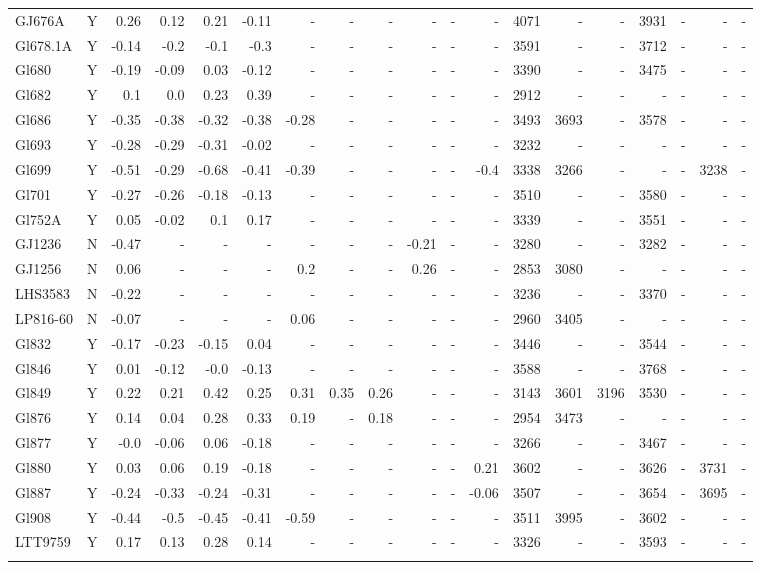 \documentclass{aa}
\begin{document}
{\begin{landscape}
{\begin{longtable}{l c r r r r r r r r r r | r r r r r r r }
GJ676A & Y & 0.26 & 0.12 & 0.21 & -0.11 & - & - & - & - & - & - & 4071 & - & - & 3931 & - & - & - \\
Gl678.1A & Y & -0.14 & -0.2 & -0.1 & -0.3 & - & - & - & - & - & - & 3591 & - & - & 3712 & - & - & - \\
Gl680 & Y & -0.19 & -0.09 & 0.03 & -0.12 & - & - & - & - & - & - & 3390 & - & - & 3475 & - & - & - \\
Gl682 & Y & 0.1 & 0.0 & 0.23 & 0.39 & - & - & - & - & - & - & 2912 & - & - & - & - & - & - \\
Gl686 & Y & -0.35 & -0.38 & -0.32 & -0.38 & -0.28 & - & - & - & - & - & 3493 & 3693 & - & 3578 & - & - & - \\
Gl693 & Y & -0.28 & -0.29 & -0.31 & -0.02 & - & - & - & - & - & - & 3232 & - & - & - & - & - & - \\
Gl699 & Y & -0.51 & -0.29 & -0.68 & -0.41 & -0.39 & - & - & - & - & -0.4 & 3338 & 3266 & - & - & - & 3238 & - \\
Gl701 & Y & -0.27 & -0.26 & -0.18 & -0.13 & - & - & - & - & - & - & 3510 & - & - & 3580 & - & - & - \\
Gl752A & Y & 0.05 & -0.02 & 0.1 & 0.17 & - & - & - & - & - & - & 3339 & - & - & 3551 & - & - & - \\
GJ1236 & N & -0.47 & - & - & - & - & - & - & -0.21 & - & - & 3280 & - & - & 3282 & - & - & - \\
GJ1256 & N & 0.06 & - & - & - & 0.2 & - & - & 0.26 & - & - & 2853 & 3080 & - & - & - & - & - \\
LHS3583 & N & -0.22 & - & - & - & - & - & - & - & - & - & 3236 & - & - & 3370 & - & - & - \\
LP816-60 & N & -0.07 & - & - & - & 0.06 & - & - & - & - & - & 2960 & 3405 & - & - & - & - & - \\
Gl832 & Y & -0.17 & -0.23 & -0.15 & 0.04 & - & - & - & - & - & - & 3446 & - & - & 3544 & - & - & - \\
Gl846 & Y & 0.01 & -0.12 & -0.0 & -0.13 & - & - & - & - & - & - & 3588 & - & - & 3768 & - & - & - \\
Gl849 & Y & 0.22 & 0.21 & 0.42 & 0.25 & 0.31 & 0.35 & 0.26 & - & - & - & 3143 & 3601 & 3196 & 3530 & - & - & - \\
Gl876 & Y & 0.14 & 0.04 & 0.28 & 0.33 & 0.19 & - & 0.18 & - & - & - & 2954 & 3473 & - & - & - & - & - \\
Gl877 & Y & -0.0 & -0.06 & 0.06 & -0.18 & - & - & - & - & - & - & 3266 & - & - & 3467 & - & - & - \\
Gl880 & Y & 0.03 & 0.06 & 0.19 & -0.18 & - & - & - & - & - & 0.21 & 3602 & - & - & 3626 & - & 3731 & - \\
Gl887 & Y & -0.24 & -0.33 & -0.24 & -0.31 & - & - & - & - & - & -0.06 & 3507 & - & - & 3654 & - & 3695 & - \\
Gl908 & Y & -0.44 & -0.5 & -0.45 & -0.41 & -0.59 & - & - & - & - & - & 3511 & 3995 & - & 3602 & - & - & - \\
LTT9759 & Y & 0.17 & 0.13 & 0.28 & 0.14 & - & - & - & - & - & - & 3326 & - & - & 3593 & - & - & - \\
\label{table:compfull}
\end{longtable}}
\end{landscape}
}
\end{document}
